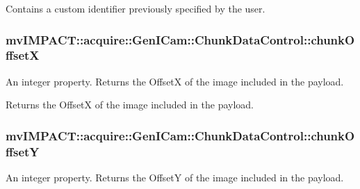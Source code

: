 Contains a custom identifier previously specified by the user. \hypertarget{classmv_i_m_p_a_c_t_1_1acquire_1_1_gen_i_cam_1_1_chunk_data_control_acc2f89fbe1e30303592aa20d17323814}{
\subsubsection[{chunk\+Offset\+X}]{ mv\+I\+M\+P\+A\+C\+T\+::acquire\+::\+Gen\+I\+Cam\+::\+Chunk\+Data\+Control\+::chunk\+Offset\+X}}\label{classmv_i_m_p_a_c_t_1_1acquire_1_1_gen_i_cam_1_1_chunk_data_control_acc2f89fbe1e30303592aa20d17323814}


An integer property. Returns the Offset\+X of the image included in the payload. 

Returns the Offset\+X of the image included in the payload. \hypertarget{classmv_i_m_p_a_c_t_1_1acquire_1_1_gen_i_cam_1_1_chunk_data_control_a02440e61ff51103cfbc224a31cee7898}{
\subsubsection[{chunk\+Offset\+Y}]{ mv\+I\+M\+P\+A\+C\+T\+::acquire\+::\+Gen\+I\+Cam\+::\+Chunk\+Data\+Control\+::chunk\+Offset\+Y}}\label{classmv_i_m_p_a_c_t_1_1acquire_1_1_gen_i_cam_1_1_chunk_data_control_a02440e61ff51103cfbc224a31cee7898}


An integer property. Returns the Offset\+Y of the image included in the payload. 


